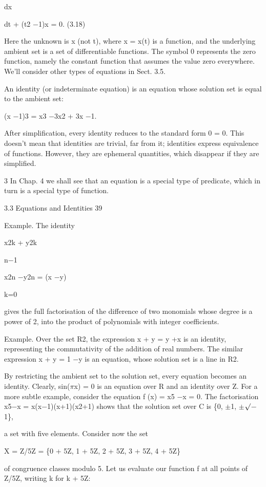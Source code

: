 \documentclass[11pt]{article}
\theoremstyle{plain}
\theoremstyle{definition}
\begin{document}
dx

dt + (t2 $-$1)x = 0. (3.18)

Here the unknown is x (not t), where x = x(t) is a function, and the underlying ambient set is a set of differentiable functions. The symbol 0 represents the zero function, namely the constant function that assumes the value zero everywhere. We'll consider other types of equations in Sect. 3.5.

An identity (or indeterminate equation) is an equation whose solution set is equal to the ambient set:

(x $-$1)3 = x3 $-$3x2 + 3x $-$1.

After simplification, every identity reduces to the standard form 0 = 0. This doesn't mean that identities are trivial, far from it; identities express equivalence of functions. However, they are ephemeral quantities, which disappear if they are simplified.

3 In Chap. 4 we shall see that an equation is a special type of predicate, which in turn is a special type of function.

3.3 Equations and Identities 39

Example. The identity

x2k + y2k

n$-$1

x2n $-$y2n = (x $-$y)

k=0

gives the full factorisation of the difference of two monomials whose degree is a power of 2, into the product of polynomials with integer coefficients.

Example. Over the set R2, the expression x + y = y +x is an identity, representing the commutativity of the addition of real numbers. The similar expression x + y = 1 $-$y is an equation, whose solution set is a line in R2.

By restricting the ambient set to the solution set, every equation becomes an identity. Clearly, sin($\pi$x) = 0 is an equation over R and an identity over Z. For a more subtle example, consider the equation f (x) = x5 $-$x = 0. The factorisation x5$-$x = x(x$-$1)(x+1)(x2+1) shows that the solution set over C is \{0, $\pm$1, $\pm$$\surd$$-$1\},

a set with five elements. Consider now the set

X = Z/5Z = \{0 + 5Z, 1 + 5Z, 2 + 5Z, 3 + 5Z, 4 + 5Z\}

of congruence classes modulo 5. Let us evaluate our function f at all points of Z/5Z, writing k for k + 5Z:
\end{document}
